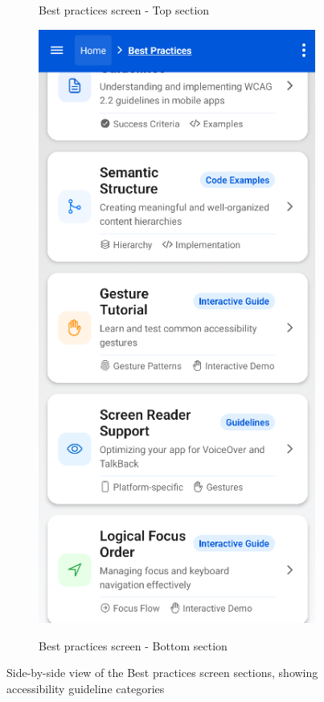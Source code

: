 \begin{figure}[ht]
\begin{subfigure}[b]{0.48\textwidth}
        \caption{Best practices screen - Top section}
        \label{fig:best-practices-top}
    \end{subfigure}
    \hfill
    \begin{subfigure}[b]{0.48\textwidth}
        \centering
        \includegraphics[width=\linewidth, alt={Second part of the Best practices screen}]{img/practices2.png}
        \caption{Best practices screen - Bottom section}
        \label{fig:best-practices-bottom}
    \end{subfigure}
    \caption{Side-by-side view of the Best practices screen sections, showing accessibility guideline categories}
    \label{fig:best_practices_screens_sidebyside}
\end{figure}
\FloatBarrier

